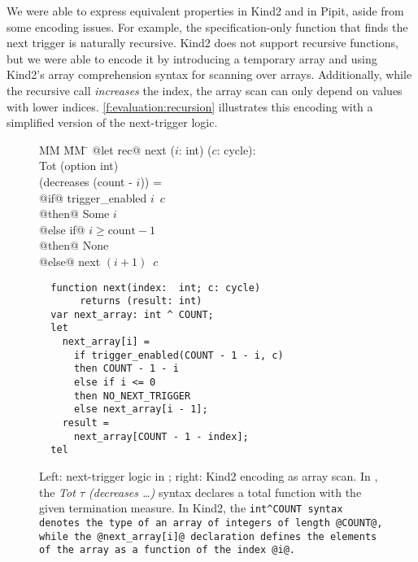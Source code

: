 We were able to express equivalent properties in Kind2 and in Pipit, aside from some encoding issues.
For example, the specification-only function that finds the next trigger is naturally recursive.
Kind2 does not support recursive functions, but we were able to encode it by introducing a temporary array and using Kind2's array comprehension syntax for scanning over arrays.
Additionally, while the recursive call \emph{increases} the index, the array scan can only depend on values with lower indices.
\autoref{f:evaluation:recursion} illustrates this encoding with a simplified version of the next-trigger logic.

\begin{figure}
\begin{minipage}{0.45\textwidth}
\begin{tabbing}
  MM \= MM \= \kill
@let rec@ next ($i$: int) ($c$: cycle): \\
  \> Tot \> (option int) \\
  \>     \> (decreases (count - $i$)) = \\
\>  @if@ trigger_enabled $i$~$c$ \\
\>  @then@ Some $i$ \\
\>  @else if@ $i \ge \text{count} - 1$ \\
\>  @then@ None \\
\>  @else@ next $(i + 1)$~$c$
\end{tabbing}
\end{minipage}
\begin{minipage}{0.55\textwidth}
\begin{verbatim}
  function next(index:  int; c: cycle)
       returns (result: int)
  var next_array: int ^ COUNT;
  let
    next_array[i] =
      if trigger_enabled(COUNT - 1 - i, c)
      then COUNT - 1 - i
      else if i <= 0
      then NO_NEXT_TRIGGER
      else next_array[i - 1];
    result =
      next_array[COUNT - 1 - index];
  tel
\end{verbatim}
\end{minipage}
\caption{Left: next-trigger logic in \fstar{}; right: Kind2 encoding as array scan. In \fstar{}, the \emph{Tot $\tau$ (decreases \ldots)} syntax declares a total function with the given termination measure.
In Kind2, the \tt{int\^{}COUNT} syntax denotes the type of an array of integers of length @COUNT@, while the @next_array[i]@ declaration defines the elements of the array as a function of the index @i@.
}
\label{f:evaluation:recursion}
\end{figure}


